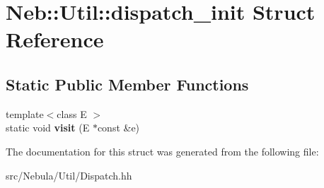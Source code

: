 \hypertarget{structNeb_1_1Util_1_1dispatch__init}{\section{\-Neb\-:\-:\-Util\-:\-:dispatch\-\_\-init \-Struct \-Reference}
\label{structNeb_1_1Util_1_1dispatch__init}
}
\subsection*{\-Static \-Public \-Member \-Functions}
\begin{DoxyCompactItemize}
\item 
\hypertarget{structNeb_1_1Util_1_1dispatch__init_a9c86759116b14d01baa72c0ad0883578}{{\footnotesize template$<$class E $>$ }\\static void {\bfseries visit} (\-E $\ast$const \&e)}\label{structNeb_1_1Util_1_1dispatch__init_a9c86759116b14d01baa72c0ad0883578}

\end{DoxyCompactItemize}


\-The documentation for this struct was generated from the following file\-:\begin{DoxyCompactItemize}
\item 
src/\-Nebula/\-Util/\-Dispatch.\-hh\end{DoxyCompactItemize}
